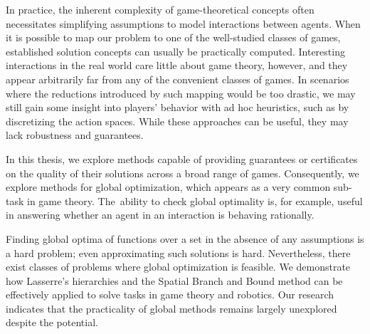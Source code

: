 \documentclass[../main.tex]{subfiles}
\begin{document}
In practice, the inherent complexity of game-theoretical concepts often necessitates simplifying assumptions to model interactions between agents. When it is possible to map our problem to one of the well-studied classes of games, established solution concepts can usually be practically computed. Interesting interactions in the real world care little about game theory, however, and they appear arbitrarily far from any of the convenient classes of games. In scenarios where the reductions introduced by such mapping would be too drastic, we may still gain some insight into players' behavior with ad hoc heuristics, such as by discretizing the action spaces. While these approaches can be useful, they may lack robustness and guarantees.

In this thesis, we explore methods capable of providing guarantees or certificates on the quality of their solutions across a broad range of games. Consequently, we explore methods for global optimization, which appears as a very common sub-task in game theory. The~ability to check global optimality is, for example, useful in answering whether an agent in an interaction is behaving rationally.

Finding global optima of functions over a set in the absence of any assumptions is a hard problem; even approximating such solutions is hard. Nevertheless, there exist classes of problems where global optimization is feasible. We demonstrate how Lasserre's hierarchies and the Spatial Branch and Bound method can be effectively applied to solve tasks in game theory and robotics. Our research indicates that the practicality of global methods remains largely unexplored despite the potential.

\newpage
\end{document}
